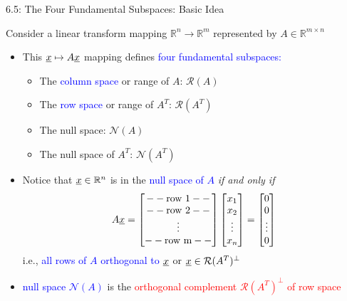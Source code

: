 \documentclass[10pt,english,aspectratio=169]{beamer}
\begin{document}
\begin{frame}{6.5: The Four Fundamental Subspaces: Basic Idea}

Consider a linear transform mapping $\mathbb{R}^n \to \mathbb{R}^m$ represented by $A\in \mathbb{R}^{m\times n}$
\vspace{1mm}

\begin{itemize}
\setlength\itemsep{2.5mm}

\item<1-> This $\underline{x} \mapsto A \underline{x}$ mapping defines \textcolor{blue}{four fundamental subspaces:} \vspace{1.5mm}
\begin{itemize}
\setlength\itemsep{1mm}
\item The \textcolor{blue}{column space} or range of $A$: $\mathcal{R}(A)$
\item The \textcolor{blue}{row space} or range of $A^T$: $\mathcal{R}(A^T)$
\item The null space: $\mathcal{N}(A)$
\item The null space of $A^T$: $\mathcal{N}(A^T)$
\end{itemize}

\vspace{0mm}

\item<2-> Notice that $\underline{x} \in \mathbb{R}^n$ is in the \textcolor{blue}{null space of $A$} \emph{if and only if} \vspace{-1mm}
\[ A \underline{x} = \begin{bmatrix} -- \text{row 1} -- \\ -- \text{row 2} -- \\ \vdots \\ -- \text{row m} -- \end{bmatrix} \begin{bmatrix}x_1 \\ x_2 \\ \vdots \\ x_n \end{bmatrix} = \begin{bmatrix} 0 \\ 0 \\ \vdots \\ 0 \end{bmatrix} \]
i.e., \textcolor{blue}{all rows of $A$ orthogonal to $\underline{x}$} or $\underline{x} \in \mathcal{R}(A^T)^\perp$
 
\item<3-> \textcolor{blue}{null space $\mathcal{N}(A)$} is the \textcolor{red}{orthogonal complement $\mathcal{R}(A^T)^\perp$ of row space}


\end{itemize}
\end{frame}
\end{document}
